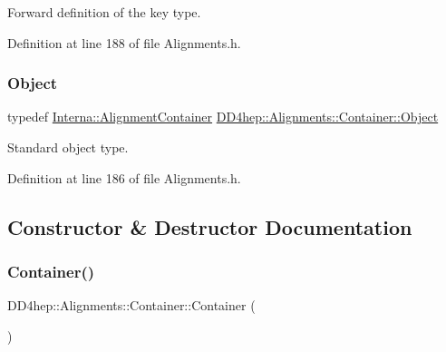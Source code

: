 Forward definition of the key type. 



Definition at line 188 of file Alignments.\+h.

\hypertarget{class_d_d4hep_1_1_alignments_1_1_container_aac463478e91949b594ffe837fd9bd9a8}{}\label{class_d_d4hep_1_1_alignments_1_1_container_aac463478e91949b594ffe837fd9bd9a8} 
\subsubsection{\texorpdfstring{Object}{Object}}
{\footnotesize\ttfamily typedef \hyperlink{class_d_d4hep_1_1_alignments_1_1_interna_1_1_alignment_container}{Interna\+::\+Alignment\+Container} \hyperlink{class_d_d4hep_1_1_alignments_1_1_container_aac463478e91949b594ffe837fd9bd9a8}{D\+D4hep\+::\+Alignments\+::\+Container\+::\+Object}}



Standard object type. 



Definition at line 186 of file Alignments.\+h.



\subsection{Constructor \& Destructor Documentation}
\hypertarget{class_d_d4hep_1_1_alignments_1_1_container_a17cf12ead74ea2c6359818a3b54668af}{}\label{class_d_d4hep_1_1_alignments_1_1_container_a17cf12ead74ea2c6359818a3b54668af} 
\subsubsection{\texorpdfstring{Container()}{Container()}\hspace{0.1cm}{\footnotesize\ttfamily [1/3]}}
{\footnotesize\ttfamily D\+D4hep\+::\+Alignments\+::\+Container\+::\+Container (\begin{DoxyParamCaption}{ }\end{DoxyParamCaption})\hspace{0.3cm}{\ttfamily [inline]}}



